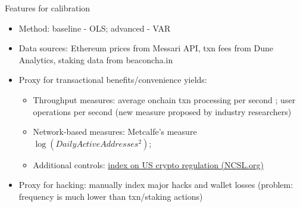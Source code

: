 \documentclass{beamer}
\begin{document}
\begin{frame}{Features for calibration}
    \begin{itemize}
        \item Method: baseline - OLS; advanced - VAR
        \item Data sources: Ethereum prices from Messari API, txn fees from Dune Analytics, staking data from beaconcha.in
        \item Proxy for transactional benefits/convenience yields: 
        \begin{itemize}
            \item Throughput measures: average onchain txn processing per second \citep{cong2022staking}; user operations per second (new measure proposed by industry researchers)
            \item Network-based measures: Metcalfe's measure $\log(DailyActiveAddresses^2)$; 
            \item Additional controls: \href{https://www.ncsl.org/financial-services/cryptocurrency-2023-legislation}{index on US crypto regulation (NCSL.org)}
        \end{itemize}
        \item Proxy for hacking: manually index major hacks and wallet losses (problem: frequency is much lower than txn/staking actions)
    \end{itemize}
\end{frame}


\end{document}
